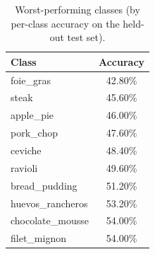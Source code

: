 \begin{table}[t]
\centering
\caption{Worst-performing classes (by per-class accuracy on the held-out test set).}
\label{tbl:worst}
\begin{tabular}{lc}
\toprule
Class & Accuracy \\
\midrule
foie\_gras & 42.80\% \\
steak & 45.60\% \\
apple\_pie & 46.00\% \\
pork\_chop & 47.60\% \\
ceviche & 48.40\% \\
ravioli & 49.60\% \\
bread\_pudding & 51.20\% \\
huevos\_rancheros & 53.20\% \\
chocolate\_mousse & 54.00\% \\
filet\_mignon & 54.00\% \\
\bottomrule
\end{tabular}
\end{table}
